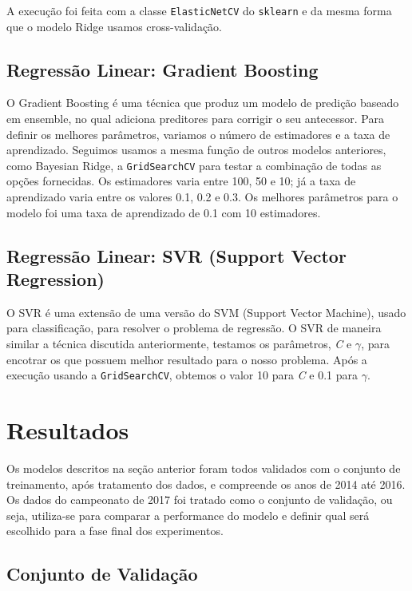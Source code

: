 \documentclass[conference]{IEEEtran}
\newcommand{\ttt}[1]{{\texttt{#1}}}
\newcommand{\tit}[1]{{\textit{#1}}}
\begin{document}
A   execução  foi   feita   com  a   classe  \ttt{ElasticNetCV}   do
\ttt{sklearn}   e  da   mesma  forma   que  o   modelo  Ridge   usamos
cross-validação.

\subsection{Regressão Linear: Gradient Boosting}

O  Gradient  Boosting  \cite{breiman1997arcing} é  uma  técnica  que
produz  um  modelo   de  predição  baseado  em   ensemble,  no  qual
adiciona preditores  para corrigir o  seu antecessor. Para  definir os
melhores parâmetros,  variamos o número  de estimadores e a  taxa de
aprendizado.  Seguimos  usamos  a  mesma função  de  outros  modelos
anteriores, como  Bayesian Ridge,  a \ttt{GridSearchCV} para  testar a
combinação  de todas  as opções  fornecidas. Os  estimadores varia
entre 100, 50 e  10; já a taxa de aprendizado  varia entre os valores
0.1, 0.2 e 0.3. Os melhores parâmetros  para o modelo foi uma taxa de
aprendizado de 0.1 com 10 estimadores.

\subsection{Regressão Linear: SVR (Support Vector Regression)}

O SVR é uma extensão de uma versão do SVM (Support Vector Machine),
usado para classificação, para resolver  o problema de regressão. O
SVR de  maneira similar  a técnica discutida  anteriormente, testamos
os  parâmetros, \tit{C}  e  $\gamma$, para  encotrar  os que  possuem
melhor resultado  para o nosso  problema. Após a execução  usando a
\ttt{GridSearchCV},  obtemos  o  valor  10 para  \tit{C}  e  0.1  para
$\gamma$.

\section{Resultados}

Os modelos descritos  na seção anterior foram todos  validados com o
conjunto de treinamento,  após tratamento dos dados,  e compreende os
anos de  2014 até 2016.  Os dados do  campeonato de 2017  foi tratado
como o  conjunto de validação,  ou seja, utiliza-se para  comparar a
performance do modelo e definir qual será escolhido para a fase final
dos experimentos.

\subsection{Conjunto de Validação}
\end{document}
